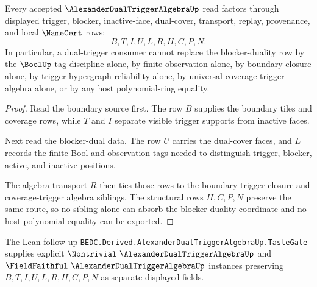 \begin{theorem}
\label{thm:alexander-dual-trigger-algebra-blocker-duality-nonescape}
Every accepted $\AlexanderDualTriggerAlgebraUp$ read factors through displayed trigger, blocker, inactive-face, dual-cover, transport, replay, provenance, and local $\NameCert$ rows:
$$
B,T,I,U,L,R,H,C,P,N.
$$
In particular, a dual-trigger consumer cannot replace the blocker-duality row by the $\BoolUp$ tag discipline alone, by finite observation alone, by boundary closure alone, by trigger-hypergraph reliability alone, by universal coverage-trigger algebra alone, or by any host polynomial-ring equality.
\end{theorem}
\begin{proof}
Read the boundary source first. The row $B$ supplies the boundary tiles and coverage rows, while $T$ and $I$ separate visible trigger supports from inactive faces.

Next read the blocker-dual data. The row $U$ carries the dual-cover faces, and $L$ records the finite Bool and observation tags needed to distinguish trigger, blocker, active, and inactive positions.

The algebra transport $R$ then ties those rows to the boundary-trigger closure and coverage-trigger algebra siblings. The structural rows $H,C,P,N$ preserve the same route, so no sibling alone can absorb the blocker-duality coordinate and no host polynomial equality can be exported.
\end{proof}



The Lean follow-up \texttt{BEDC.Derived.AlexanderDualTriggerAlgebraUp.TasteGate} supplies explicit $\Nontrivial\ \AlexanderDualTriggerAlgebraUp$ and $\FieldFaithful\ \AlexanderDualTriggerAlgebraUp$ instances preserving $B,T,I,U,L,R,H,C,P,N$ as separate displayed fields.

